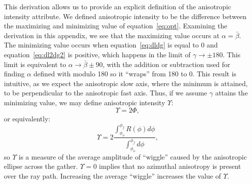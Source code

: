 This derivation allows us to provide an explicit definition of the anisotropic intensity attribute.  We defined anisotropic intensity to be the difference between the maximizing and minimizing value of equation~\ref{eq:opt}.  Examining the derivation in this appendix, we see that the maximizing value occurs at $\alpha = \bar{\beta}$.  The minimizing value occurs when equation~\ref{eq:dldg} is equal to 0 and equation~\ref{eq:dl2dg2} is positive, which happens in the limit of $\gamma \rightarrow \pm 180$. This limit is equivalent to $\alpha \rightarrow \bar{\beta} \pm 90$, with the addition or subtraction used for finding $\alpha$  defined with modulo 180 so it ``wraps'' from 180 to 0.  This result is intuitive, as we expect the anisotropic slow axis, where the minimum is attained, to be perpendicular to the anisotropic fast axis.  Thus, if we assume $\gamma$ attains the minimizing value, we may define anisotropic intensity 
$\Upsilon$:
\begin{equation}
\label{eq:intensityeq2}
\Upsilon = 2\Phi  ,
\end{equation}
or equivalently:
\begin{equation}
\label{eq:intensityeq1}
\Upsilon = 2 \frac{  \int_{\phi_{o}} ^{\phi_{f}} R \left(\phi \right)d\phi}{\int_{\phi_{o}} ^{\phi_{f}} d\phi} ,
\end{equation}
so $\Upsilon$ is a measure of the average amplitude of ``wiggle'' caused by the anisotropic ellipse across the gather.  $\Upsilon = 0$ implies that no azimuthal anisotropy is present over the ray path. Increasing the average ``wiggle'' increases the value of $\Upsilon$.

\onecolumn




